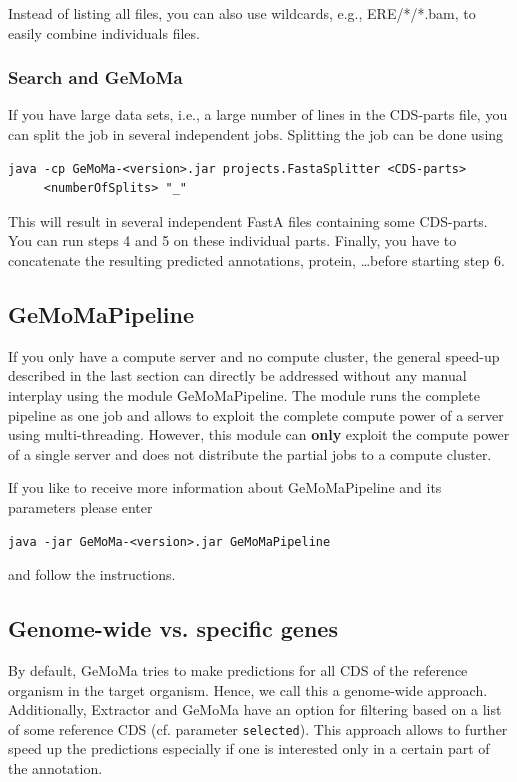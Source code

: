 \documentclass{article}
\begin{document}
Instead of listing all files, you can also use wildcards, e.g., ERE/*/*.bam, to easily combine individuals files.

\subsubsection{Search and GeMoMa}
If you have large data sets, i.e., a large number of lines in the CDS-parts file, you can split the job in several independent jobs. Splitting the job can be done using
\begin{verbatim}
java -cp GeMoMa-<version>.jar projects.FastaSplitter <CDS-parts> 
     <numberOfSplits> "_"
\end{verbatim}

This will result in several independent FastA files containing some CDS-parts. You can run steps 4 and 5 on these individual parts.
Finally, you have to concatenate the resulting predicted annotations, protein, \ldots before starting step 6.

\subsection{GeMoMaPipeline}
If you only have a compute server and no compute cluster, the general speed-up described in the last section can directly be addressed without any manual interplay using the module GeMoMaPipeline. The module runs the complete pipeline as one job and allows to exploit the complete compute power of a server using multi-threading. 
However, this module can \textbf{only} exploit the compute power of a single server and does not distribute the partial jobs to a compute cluster.

If you like to receive more information about GeMoMaPipeline and its parameters please enter
\begin{verbatim}
java -jar GeMoMa-<version>.jar GeMoMaPipeline
\end{verbatim}
and follow the instructions.

\subsection{Genome-wide vs. specific genes}
By default, GeMoMa tries to make predictions for all CDS of the reference organism in the target organism. Hence, we call this a genome-wide approach. Additionally, Extractor and GeMoMa have an option for filtering based on a list of some reference CDS (cf. parameter \texttt{selected}). This approach allows to further speed up the predictions especially if one is interested only in a certain part of the annotation.
\end{document}
